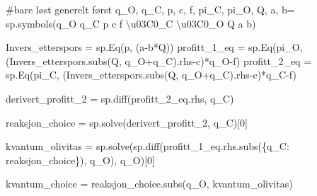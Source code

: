\documentclass[
  12pt,
  a4paper,
  DIV=11,
  numbers=noendperiod]{scrartcl}
\newenvironment{Shaded}{\begin{snugshade}}{\end{snugshade}}
\newcommand{\CharTok}[1]{\textcolor[rgb]{0.13,0.47,0.30}{#1}}
\newcommand{\CommentTok}[1]{\textcolor[rgb]{0.37,0.37,0.37}{#1}}
\newcommand{\DecValTok}[1]{\textcolor[rgb]{0.68,0.00,0.00}{#1}}
\newcommand{\NormalTok}[1]{\textcolor[rgb]{0.00,0.23,0.31}{#1}}
\newcommand{\OperatorTok}[1]{\textcolor[rgb]{0.37,0.37,0.37}{#1}}
\newcommand{\StringTok}[1]{\textcolor[rgb]{0.13,0.47,0.30}{#1}}
\begin{document}
\begin{Shaded}
\begin{Highlighting}[]
\CommentTok{\#bare løst generelt først}
\NormalTok{q\_O, q\_C, p, c, f, pi\_C, pi\_O, Q, a, b}\OperatorTok{=}\NormalTok{ sp.symbols(}\StringTok{\textquotesingle{}q\_O q\_C p c f }\CharTok{\textbackslash{}u03C0}\StringTok{\_C }\CharTok{\textbackslash{}u03C0}\StringTok{\_O Q a b\textquotesingle{}}\NormalTok{)}

\NormalTok{Invers\_etterspors }\OperatorTok{=}\NormalTok{ sp.Eq(p, (a}\OperatorTok{{-}}\NormalTok{b}\OperatorTok{*}\NormalTok{Q))}
\NormalTok{profitt\_1\_eq }\OperatorTok{=}\NormalTok{ sp.Eq(pi\_O, (Invers\_etterspors.subs(Q, q\_O}\OperatorTok{+}\NormalTok{q\_C).rhs}\OperatorTok{{-}}\NormalTok{c)}\OperatorTok{*}\NormalTok{q\_O}\OperatorTok{{-}}\NormalTok{f)}
\NormalTok{profitt\_2\_eq }\OperatorTok{=}\NormalTok{ sp.Eq(pi\_C, (Invers\_etterspors.subs(Q, q\_O}\OperatorTok{+}\NormalTok{q\_C).rhs}\OperatorTok{{-}}\NormalTok{c)}\OperatorTok{*}\NormalTok{q\_C}\OperatorTok{{-}}\NormalTok{f)}



\NormalTok{derivert\_profitt\_2 }\OperatorTok{=}\NormalTok{ sp.diff(profitt\_2\_eq.rhs, q\_C)}

\NormalTok{reaksjon\_choice }\OperatorTok{=}\NormalTok{ sp.solve(derivert\_profitt\_2, q\_C)[}\DecValTok{0}\NormalTok{]}


\NormalTok{kvantum\_olivitas }\OperatorTok{=}\NormalTok{ sp.solve(sp.diff(profitt\_1\_eq.rhs.subs(\{q\_C: reaksjon\_choice\}), q\_O), q\_O)[}\DecValTok{0}\NormalTok{]}

\NormalTok{kvantum\_choice }\OperatorTok{=}\NormalTok{ reaksjon\_choice.subs(q\_O, kvantum\_olivitas)}
\end{Highlighting}
\end{Shaded}
\end{document}
